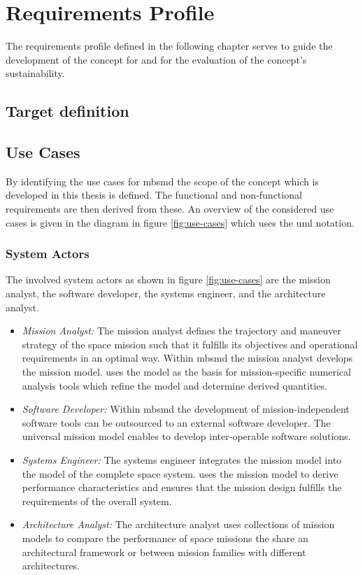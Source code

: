 \chapter{Requirements Profile}
\label{sec:requirements-profile}
The requirements profile defined in the following chapter serves to guide the development of the concept for \topic and for the evaluation of the concept's sustainability.

\section{Target definition}
\label{sec:target-definition}

\section{Use Cases}
\label{sec:use-cases}

By identifying the use cases for \ac{mbsmd} the scope of the concept which is developed in this thesis is defined.
The functional and non-functional requirements are then derived from these.
An overview of the considered use cases is given in the diagram in figure \ref{fig:use-cases} which uses the \ac{uml} notation.



\subsection{System Actors}
\label{sec:involved-actors}
The involved system actors as shown in figure \ref{fig:use-cases} are the mission analyst, the software developer, the systems engineer, and the architecture analyst.
\begin{itemize}
    \item \emph{Mission Analyst:}
        The mission analyst defines the trajectory and maneuver strategy of the space mission such that it fulfills its objectives and operational requirements in an optimal way.
        Within \ac{mbsmd} the mission analyst develops the mission model.
        \Heshe uses the model as the basis for mission-specific numerical analysis tools which refine the model and determine derived quantities.
    \item \emph{Software Developer:}
        Within \ac{mbsmd} the development of mission-independent software tools can be outsourced to an external software developer.
        The universal mission model enables \himher to develop inter-operable software solutions.
    \item \emph{Systems Engineer:}
        The systems engineer integrates the mission model into the model of the complete space system.
        \Heshe uses the mission model to derive performance characteristics and ensures that the mission design fulfills the requirements of the overall system.
    \item \emph{Architecture Analyst:}
        The architecture analyst uses collections of mission models to compare the performance of space missions the share an architectural framework or between mission families with different architectures.
\end{itemize}

